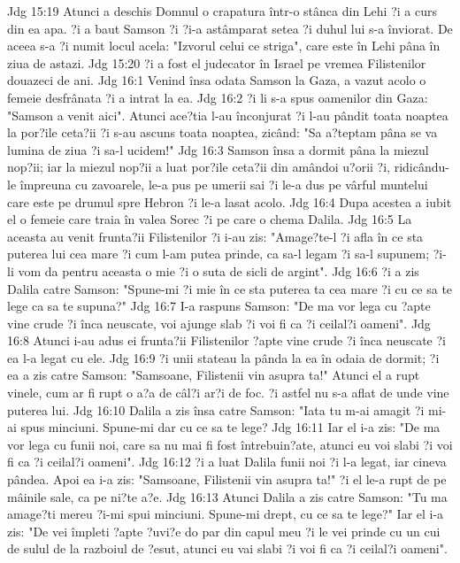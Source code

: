 Jdg 15:19  Atunci a deschis Domnul o crapatura într-o stânca din Lehi ?i a curs din ea apa. ?i a baut Samson ?i ?i-a astâmparat setea ?i duhul lui s-a înviorat. De aceea s-a ?i numit locul acela: "Izvorul celui ce striga", care este în Lehi pâna în ziua de astazi.
Jdg 15:20  ?i a fost el judecator în Israel pe vremea Filistenilor douazeci de ani.
Jdg 16:1  Venind însa odata Samson la Gaza, a vazut acolo o femeie desfrânata ?i a intrat la ea.
Jdg 16:2  ?i li s-a spus oamenilor din Gaza: "Samson a venit aici". Atunci ace?tia l-au înconjurat ?i l-au pândit toata noaptea la por?ile ceta?ii ?i s-au ascuns toata noaptea, zicând: "Sa a?teptam pâna se va lumina de ziua ?i sa-l ucidem!"
Jdg 16:3  Samson însa a dormit pâna la miezul nop?ii; iar la miezul nop?ii a luat por?ile ceta?ii din amândoi u?orii ?i, ridicându-le împreuna cu zavoarele, le-a pus pe umerii sai ?i le-a dus pe vârful muntelui care este pe drumul spre Hebron ?i le-a lasat acolo.
Jdg 16:4  Dupa acestea a iubit el o femeie care traia în valea Sorec ?i pe care o chema Dalila.
Jdg 16:5  La aceasta au venit frunta?ii Filistenilor ?i i-au zis: "Amage?te-l ?i afla în ce sta puterea lui cea mare ?i cum l-am putea prinde, ca sa-l legam ?i sa-l supunem; ?i-li vom da pentru aceasta o mie ?i o suta de sicli de argint".
Jdg 16:6  ?i a zis Dalila catre Samson: "Spune-mi ?i mie în ce sta puterea ta cea mare ?i cu ce sa te lege ca sa te supuna?"
Jdg 16:7  I-a raspuns Samson: "De ma vor lega cu ?apte vine crude ?i înca neuscate, voi ajunge slab ?i voi fi ca ?i ceilal?i oameni".
Jdg 16:8  Atunci i-au adus ei frunta?ii Filistenilor ?apte vine crude ?i înca neuscate ?i ea l-a legat cu ele.
Jdg 16:9  ?i unii stateau la pânda la ea în odaia de dormit; ?i ea a zis catre Samson: "Samsoane, Filistenii vin asupra ta!" Atunci el a rupt vinele, cum ar fi rupt o a?a de câl?i ar?i de foc. ?i astfel nu s-a aflat de unde vine puterea lui.
Jdg 16:10  Dalila a zis însa catre Samson: "Iata tu m-ai amagit ?i mi-ai spus minciuni. Spune-mi dar cu ce sa te lege?
Jdg 16:11  Iar el i-a zis: "De ma vor lega cu funii noi, care sa nu mai fi fost întrebuin?ate, atunci eu voi slabi ?i voi fi ca ?i ceilal?i oameni".
Jdg 16:12  ?i a luat Dalila funii noi ?i l-a legat, iar cineva pândea. Apoi ea i-a zis: "Samsoane, Filistenii vin asupra ta!" ?i el le-a rupt de pe mâinile sale, ca pe ni?te a?e.
Jdg 16:13  Atunci Dalila a zis catre Samson: "Tu ma amage?ti mereu ?i-mi spui minciuni. Spune-mi drept, cu ce sa te lege?" Iar el i-a zis: "De vei împleti ?apte ?uvi?e do par din capul meu ?i le vei prinde cu un cui de sulul de la razboiul de ?esut, atunci eu vai slabi ?i voi fi ca ?i ceilal?i oameni".
